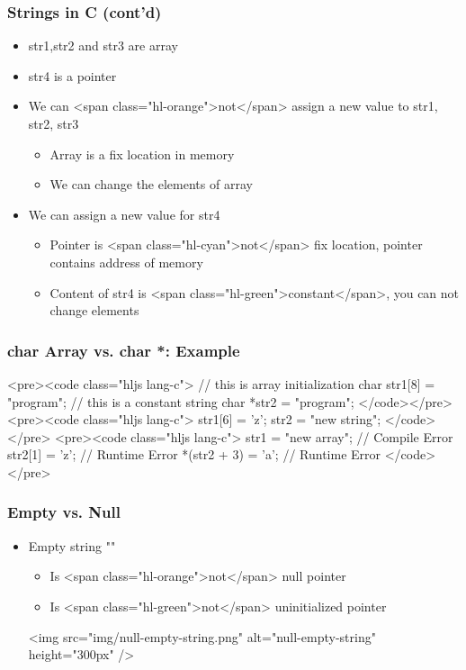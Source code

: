 \documentclass{../c-lecture}
\begin{document}
\begin{frame}
  \frametitle{Strings in C (cont’d)}
  \begin{itemize}
    \item str1,str2 and str3 are array
    \item str4 is a pointer
    \item
      We can <span class="hl-orange">not</span> assign a new value to str1,
      str2, str3

    \begin{itemize}
      \item Array is a fix location in memory
      \item We can change the elements of array
    \end{itemize}
    \item We can assign a new value for str4
    \begin{itemize}
      \item
        Pointer is <span class="hl-cyan">not</span> fix location, pointer
        contains address of memory

      \item
        Content of str4 is <span class="hl-green">constant</span>, you can not
        change elements

    \end{itemize}
  \end{itemize}
\end{frame}
\begin{frame}
  \frametitle{char Array vs. char *: Example}
  <pre><code class="hljs lang-c">
// this is array initialization
char str1[8] = "program";
// this is a constant string
char *str2 = "program";
  </code></pre>
  <pre><code class="hljs lang-c">
str1[6] = 'z';
str2 = "new string";
  </code></pre>
  <pre><code class="hljs lang-c">
str1 = "new array"; // Compile Error
str2[1] = 'z'; // Runtime Error
*(str2 + 3) = 'a'; // Runtime Error
  </code></pre>
\end{frame}
\begin{frame}
  \frametitle{Empty vs. Null}
  \begin{itemize}
    \item Empty string ""
    \begin{itemize}
      \item Is <span class="hl-orange">not</span> null pointer
      \item Is <span class="hl-green">not</span> uninitialized pointer
    \end{itemize}
    <img
      src="img/null-empty-string.png"
      alt="null-empty-string"
      height="300px"
    />
  \end{itemize}
\end{frame}
\end{document}
